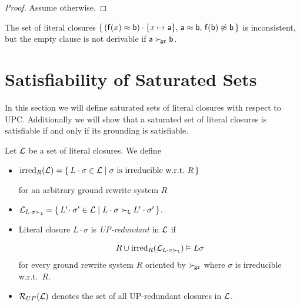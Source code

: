   \begin{proof}
        Assume otherwise.

   \end{proof}

           \begin{example}
        The set of literal closures
       \( \{ \,
        (\mathsf{f}(x)\approx\mathsf{b})\cdot \{ x\mapsto\mathsf{a} \}, \,
       \mathsf{a}\approx \mathsf{b}, \,
       \mathsf{f}(\mathsf{b})\not\approx\mathsf{b} \,
       \} \) is inconsistent,
        but the empty clause is not derivable
        if \( \mathsf{a}\mathrel\succ_{\!\mathtt{gr}}\mathsf{b} \).
           \end{example}

\section{Satisfiability of Saturated Sets}\label{sec:inst:saturated:sets}

In this section we will define saturated sets of literal closures
with respect to UPC.
Additionally we will show that a saturated set of literal closures
is satisfiable if and only if its grounding is satisfiable.

   \begin{definition}[UP-Redundancy]
        Let \( \mathcal{L} \) be a set of literal closures. We define
       \begin{itemize}
           \item \( \operatorname{irred}_R(\mathcal{L}) =
           \{ \,
            L\cdot\sigma\in\mathcal{L} \mid
           \sigma\text{ is irreducible w.r.t.~}R
           \, \} \)

        for an arbitrary ground rewrite system \( R \)

       \item
       \(
       \mathcal{L}_{L\cdot\sigma\mathrel\succ_{\mathtt{L}}} =
       \{ \,
        L'\!\cdot\sigma'\in\mathcal{L} \mid
        L\cdot\sigma\mathrel\succ_{\mathtt{L}} L'\cdot\sigma'
       \, \}
         \).

       \item Literal closure \( L\cdot\sigma \) is \emph{UP-redundant} in \( \mathcal{L} \) if

       \begin{gather*}
            R \cup \operatorname{irred}_R(\mathcal{L}_{L\cdot\sigma\mathrel\succ_{\mathtt{L}}}) \vDash L\sigma
       \end{gather*}
        for every ground rewrite system \( R \)
        oriented by \( \mathrel\succ_{\!\mathtt{gr}} \)
        where \( \sigma \) is irreducible w.r.t.~\( R \).

       \item
       \( \mathcal{R}_{UP}(\mathcal{L}) \) denotes the set of all UP-redundant closures in \( \mathcal{L} \).
   \end{itemize}
\end{definition}

